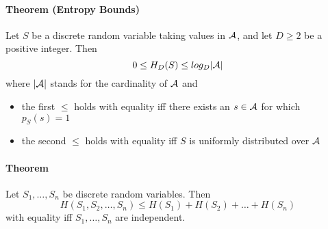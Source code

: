 \documentclass[1Opt]{report}
\begin{document}
\paragraph{Theorem (Entropy Bounds)}
Let $S$ be a discrete random variable taking values in $\cal A$, and let
$D\geq2$ be a positive integer. Then
\[ 0\leq H_D(S)\leq log_D|{\cal A}| \]
where $|{\cal A}|$ stands for the cardinality of $\cal A$ and
\begin{itemize}
  \item the first $\leq$ holds with equality iff there exists an $s\in{\cal A}$ for
  which $p_S(s)=1$
  \item the second $\leq$ holds with equality iff $S$ is uniformly distributed over
  $\cal A$
\end{itemize}

\paragraph{Theorem}
Let $S_1,\ldots,S_n$ be discrete random variables. Then
\[H(S_1,S_2,\ldots,S_n)\leq H(S_1)+H(S_2)+\ldots+H(S_n)\]
with equality iff $S_1,\ldots,S_n$ are independent.
\end{document}
